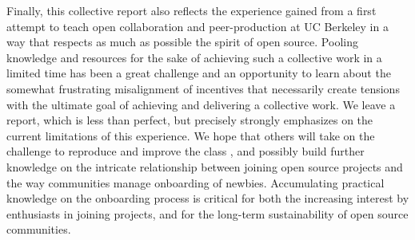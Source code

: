 \noindent Finally, this collective report also reflects the experience gained from a first attempt to teach open collaboration and peer-production at UC Berkeley in a way that respects as much as possible the spirit of open source. Pooling knowledge and resources for the sake of achieving such a collective work in a limited time has been a great challenge and an opportunity to learn about the somewhat frustrating misalignment of incentives that necessarily create tensions with the ultimate goal of achieving and delivering a collective work. We leave a report, which is less than perfect, but precisely strongly emphasizes on the current limitations of this experience. We hope that others will take on the challenge to reproduce and improve the class \cite{classweb2013}, and possibly build further knowledge on the intricate relationship between joining open source projects and the way communities manage onboarding of newbies. Accumulating practical knowledge on the onboarding process is critical for both the increasing interest by enthusiasts in joining projects, and for the long-term sustainability of open source communities.


